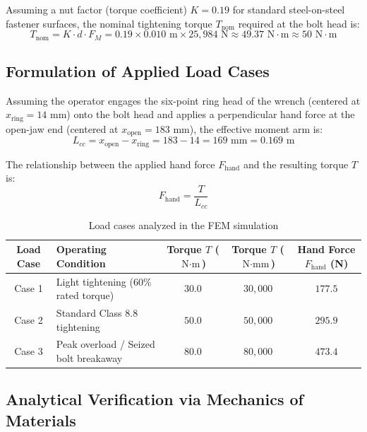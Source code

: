 \documentclass[12pt,a4paper]{article}
\begin{document}
Assuming a nut factor (torque coefficient) $K = 0.19$ for standard steel-on-steel fastener surfaces, the nominal tightening torque $T_{\text{nom}}$ required at the bolt head is:
\begin{equation}
    T_{\text{nom}} = K \cdot d \cdot F_M = 0.19 \times 0.010\text{ m} \times 25,984\text{ N} \approx 49.37\text{ N}\cdot\text{m} \approx 50\text{ N}\cdot\text{m}
\end{equation}

\subsection{Formulation of Applied Load Cases}
Assuming the operator engages the six-point ring head of the wrench (centered at $x_{\text{ring}} = 14\text{ mm}$) onto the bolt head and applies a perpendicular hand force at the open-jaw end (centered at $x_{\text{open}} = 183\text{ mm}$), the effective moment arm is:
\begin{equation}
    L_{cc} = x_{\text{open}} - x_{\text{ring}} = 183 - 14 = 169\text{ mm} = 0.169\text{ m}
\end{equation}

The relationship between the applied hand force $F_{\text{hand}}$ and the resulting torque $T$ is:
\begin{equation}
    F_{\text{hand}} = \frac{T}{L_{cc}}
\end{equation}

\begin{table}[h!]
\centering
\caption{Load cases analyzed in the FEM simulation}
\vspace{4pt}
\begin{tabular}{@{}clccc@{}}
\toprule
\textbf{Load Case} & \textbf{Operating Condition} & \textbf{Torque $T$ ($\text{N}\cdot\text{m}$)} & \textbf{Torque $T$ ($\text{N}\cdot\text{mm}$)} & \textbf{Hand Force $F_{\text{hand}}$ (N)} \\ \midrule
Case 1 & Light tightening ($60\%$ rated torque) & $30.0$ & $30,000$ & $177.5$ \\
Case 2 & Standard Class 8.8 tightening & $50.0$ & $50,000$ & $295.9$ \\
Case 3 & Peak overload / Seized bolt breakaway & $80.0$ & $80,000$ & $473.4$ \\ \bottomrule
\end{tabular}
\end{table}

\subsection{Analytical Verification via Mechanics of Materials}
\end{document}
